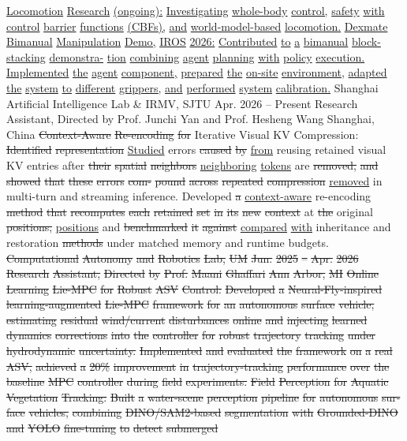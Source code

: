 \documentclass[10pt,letterpaper]{article}
\newcommand{\del}[1]{{\color{red}\sout{#1}}}
\newcommand{\add}[1]{{\color{blue}\uline{#1}}}
\begin{document}
\add{Locomotion} \add{Research} \add{(ongoing):} \add{Investigating} \add{whole-body} \add{control,} \add{safety} \add{with} \add{control} \add{barrier} \add{functions} \add{(CBFs),} \add{and} \add{world-model-based} \add{locomotion.} \add{} \add{Dexmate} \add{Bimanual} \add{Manipulation} \add{Demo,} \add{IROS} \add{2026:} \add{Contributed} \add{to} \add{a} \add{bimanual} \add{block-stacking} \add{demonstra-} \add{tion} \add{combining} \add{agent} \add{planning} \add{with} \add{policy} \add{execution.} \add{Implemented} \add{the} \add{agent} \add{component,} \add{prepared} \add{the} \add{on-site} \add{environment,} \add{adapted} \add{the} \add{system} \add{to} \add{different} \add{grippers,} \add{and} \add{performed} \add{system} \add{calibration.} Shanghai Artificial Intelligence Lab \& IRMV, SJTU Apr. 2026 -- Present Research Assistant, Directed by Prof. Junchi Yan and Prof. Hesheng Wang Shanghai, China  \del{Context-Aware} \del{Re-encoding} \del{for} Iterative Visual KV Compression: \del{Identified} \del{representation} \add{Studied} errors \del{caused} \del{by} \add{from} reusing retained visual KV entries after \del{their} \del{spatial} \del{neighbors} \add{neighboring} \add{tokens} are \del{removed,} \del{and} \del{showed} \del{that} \del{these} \del{errors} \del{com-} \del{pound} \del{across} \del{repeated} \del{compression} \add{removed} in multi-turn and streaming inference. Developed \del{a} \add{context-aware} re-encoding \del{method} \del{that} \del{recomputes} \del{each} \del{retained} \del{set} \del{in} \del{its} \del{new} \del{context} at \del{the} original \del{positions,} \add{positions} and \del{benchmarked} \del{it} \del{against} \add{compared} \add{with} inheritance and restoration \del{methods} under matched memory and runtime budgets. \del{Computational} \del{Autonomy} \del{and} \del{Robotics} \del{Lab,} \del{UM} \del{Jun.} \del{2025} \del{--} \del{Apr.} \del{2026} \del{Research} \del{Assistant,} \del{Directed} \del{by} \del{Prof.} \del{Maani} \del{Ghaffari} \del{Ann} \del{Arbor,} \del{MI} \del{} \del{Online} \del{Learning} \del{Lie-MPC} \del{for} \del{Robust} \del{ASV} \del{Control:} \del{Developed} \del{a} \del{Neural-Fly-inspired} \del{learning-augmented} \del{Lie-MPC} \del{framework} \del{for} \del{an} \del{autonomous} \del{surface} \del{vehicle,} \del{estimating} \del{residual} \del{wind/current} \del{disturbances} \del{online} \del{and} \del{injecting} \del{learned} \del{dynamics} \del{corrections} \del{into} \del{the} \del{controller} \del{for} \del{robust} \del{trajectory} \del{tracking} \del{under} \del{hydrodynamic} \del{uncertainty.} \del{Implemented} \del{and} \del{evaluated} \del{the} \del{framework} \del{on} \del{a} \del{real} \del{ASV,} \del{achieved} \del{a} \del{20\%} \del{improvement} \del{in} \del{trajectory-tracking} \del{performance} \del{over} \del{the} \del{baseline} \del{MPC} \del{controller} \del{during} \del{field} \del{experiments.} \del{} \del{Field} \del{Perception} \del{for} \del{Aquatic} \del{Vegetation} \del{Tracking:} \del{Built} \del{a} \del{water-scene} \del{perception} \del{pipeline} \del{for} \del{autonomous} \del{sur-} \del{face} \del{vehicles,} \del{combining} \del{DINO/SAM2-based} \del{segmentation} \del{with} \del{Grounded-DINO} \del{and} \del{YOLO} \del{fine-tuning} \del{to} \del{detect} \del{submerged} 
\end{document}

